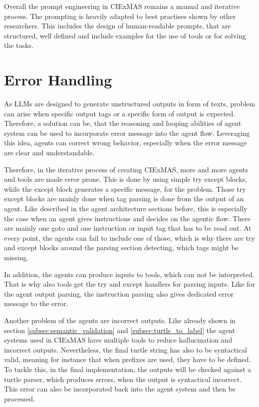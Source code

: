 \documentclass[a4paper,oneside,bibliography=totoc]{scrbook}
\begin{document}
Overall the prompt engineering in CIExMAS remains a manual and iterative process. The prompting is heavily adapted to best practises shown by other researchers. This includes the design of human-readable prompts, that are structured, well defined and include examples for the use of tools or for solving the tasks.

\section{Error Handling}
\label{sec:error_incorportion}

As \acp{LLM} are designed to generate unstructured outputs in form of texts, problem can arise when specific output tags or a specific form of output is expected. Therefore, a solution can be, that the reasoning and looping abilities of agent system can be used to incorporate error message into the agent flow. Leveraging this idea, agents can correct wrong behavior, especially when the error message are clear and understandable.

Therefore, in the iterative process of creating CIExMAS, more and more agents and tools are made error prone. This is done by using simple try except blocks, while the except block generates a specific message, for the problem. Those try except blocks are mainly done when tag parsing is done from the output of an agent. Like described in the agent architecture sections before, this is especially the case when an agent gives instructions and decides on the agentic flow. There are mainly one goto and one instruction or input tag that has to be read out. At every point, the agents can fail to include one of those, which is why there are try and except blocks around the parsing section detecting, which tags might be missing.

In addition, the agents can produce inputs to tools, which can not be interpreted. That is why also tools get the try and except handlers for parsing inputs. Like for the agent output parsing, the instruction parsing also gives dedicated error message to the error.

Another problem of the agents are incorrect outputs. Like already shown in section \ref{subsec:semantic_validation} and \ref{subsec:turtle_to_label} the agent systems used in CIExMAS have multiple tools to reduce hallucination and incorrect outputs. Nevertheless, the final turtle string has also to be syntactical valid, meaning for instance that when prefixes are used, they have to be defined. To tackle this, in the final implementation, the outputs will be checked against a turtle parser, which produces errors, when the output is syntactical incorrect. This error can also be incorporated back into the agent system and then be processed.
\end{document}
